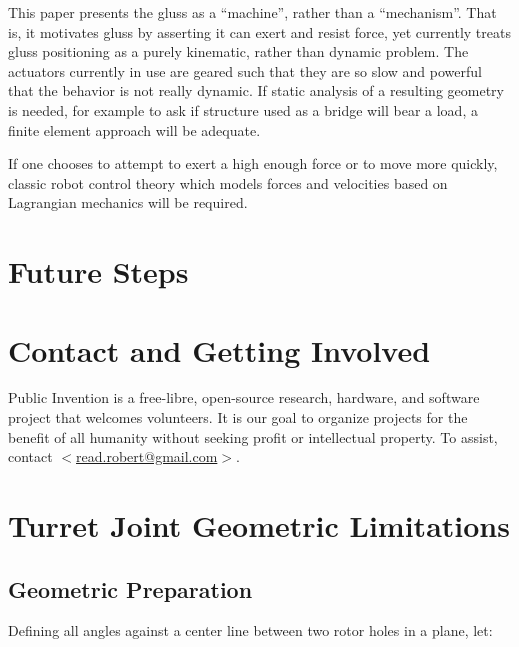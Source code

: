 \documentclass[11pt]{article}
\begin{document}
This paper presents the gluss as a ``machine'', rather than a ``mechanism''. That is, it motivates gluss
by asserting it can exert and resist force, yet currently treats gluss positioning as a purely kinematic,
rather than dynamic problem. The actuators currently in use are geared such that they are so slow
and powerful that the behavior is not really dynamic. If static analysis of a resulting geometry is
needed, for example to ask if structure used as a bridge will bear a load, a finite element approach\cite{géradin2001flexible} will be adequate.

If one chooses to attempt to exert a high enough force or to move more quickly, classic robot control theory
which models forces and velocities based on Lagrangian mechanics will be required.


\section{Future Steps}
\label{futuresteps}

\section{Contact and Getting Involved}

Public Invention
is a free-libre, open-source research, hardware, and software project that welcomes volunteers.
It is our goal to organize projects for the benefit of all humanity without seeking profit or intellectual property.
To assist, contact \href{mailto:read.robert@gmail.com}{$<$read.robert@gmail.com$>$}.






\newpage



\appendix

\section{Turret Joint Geometric Limitations}

\label{phiproof}

\subsection{Geometric Preparation}



Defining all angles against a center line between two rotor holes in a plane,
let:
\end{document}

